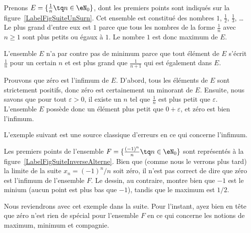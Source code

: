 \begin{example}
	Prenons \( E=\{ \frac{1}{ n }\tq n\in\eN_0 \}\), dont les premiers points sont indiqués sur la figure~\ref{LabelFigSuiteUnSurn}. Cet ensemble est constitué des nombres \( 1\), \( \frac{ 1 }{2}\), \( \frac{1}{ 3 }\), \ldots Le plus grand d'entre eux est \( 1\) parce que tous les nombres de la forme \( \frac{1}{ n }\) avec \( n\geq 1\) sont plus petits ou égaux à \( 1\). Le nombre \( 1\) est donc maximum de \( E\).

	L'ensemble \( E\) n'a par contre pas de minimum parce que tout élément de \( E\) s'écrit \( \frac{1}{ n }\) pour un certain \( n\) et est plus grand que \( \frac{1}{ n+1 }\) qui est également dans \( E\).

	Prouvons que zéro est l'infimum de \( E\). D'abord, tous les éléments de \( E\) sont strictement positifs, donc zéro est certainement un minorant de \( E\). Ensuite, nous savons que pour tout \( \varepsilon>0\), il existe un \( n\) tel que \( \frac{1}{ n }\) est plus petit que \( \varepsilon\). L'ensemble \( E\) possède donc un élément plus petit que \( 0+\varepsilon\), et zéro est bien l'infimum.
\end{example}

\newcommand{\CaptionFigSuiteUnSurn}{Les premiers points du type \( x_n=1/n\).}


L'exemple suivant est une source classique d'erreurs en ce qui concerne l'infimum.

\begin{example}
	Les premiers points de l'ensemble \( F=\{ \frac{ (-1)^n }{ n }\tq n\in\eN_0 \}\) sont représentés à la figure~\ref{LabelFigSuiteInverseAlterne}. Bien que (comme nous le verrons plus tard) la limite de la suite \( x_n=(-1)^n/n\) soit zéro, il n'est pas correct de dire que zéro est l'infimum de l'ensemble \( F\). Le dessin, au contraire, montre bien que \( -1\) est le minium (aucun point est plus bas que \( -1\)), tandis que le maximum est \( 1/2\).

	Nous reviendrons avec cet exemple dans la suite. Pour l'instant, ayez bien en tête que zéro n'est rien de spécial pour l'ensemble \( F\) en ce qui concerne les notions de maximum, minimum et compagnie.
\end{example}
\newcommand{\CaptionFigSuiteInverseAlterne}{Les quelques premiers points du type \( (-1)^n/n\).}


